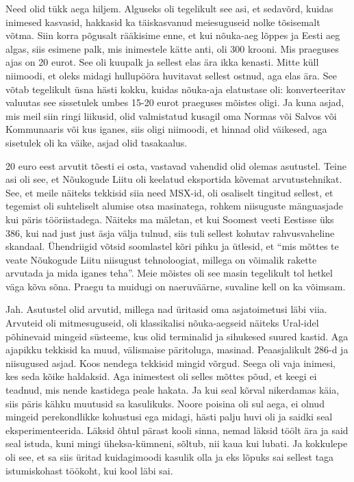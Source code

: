 
Need olid  tükk aega hiljem. Alguseks oli tegelikult see asi, et sedavõrd, 
kuidas inimesed kasvasid, hakkasid ka täiskasvanud  meiesuguseid nolke 
tõsisemalt võtma. Siin korra põgusalt rääkisime enne, et kui nõuka-aeg lõppes 
ja Eesti aeg algas, siis esimene palk, mis inimestele kätte anti, oli 300 
krooni. Mis praeguses ajas on 20 eurot. See oli kuupalk ja sellest elas ära 
ikka kenasti. Mitte küll niimoodi, et oleks midagi hullupööra huvitavat sellest 
ostnud, aga elas ära. See võtab tegelikult üsna hästi kokku, kuidas nõuka-aja 
elatustase oli: konverteeritav valuutas see sissetulek umbes 15-20 eurot 
praeguses mõistes oligi. Ja kuna asjad, mis meil siin ringi liikusid, olid 
valmistatud kusagil oma Normas või Salvos või Kommunaaris või kus iganes,  siis 
 oligi niimoodi,  et hinnad olid väikesed, aga sisetulek oli ka väike, asjad 
olid tasakaalus. 


20 euro eest arvutit tõesti ei osta, vastavad vahendid olid olemas asutustel. 
Teine asi oli see, et Nõukogude Liitu oli keelatud eksportida kõvemat 
arvutustehnikat. See, et meile näiteks tekkisid siia need MSX-id, oli osaliselt 
tingitud sellest, et tegemist oli suhteliselt alumise otsa masinatega,  rohkem 
niisuguste mänguasjade kui  päris tööriistadega. Näiteks ma mäletan, et kui 
Soomest veeti Eestisse üks 386, kui nad just just äsja välja tulnud,  siis tuli 
sellest kohutav rahvusvaheline skandaal. Ühendriigid võtsid soomlastel kõri 
pihku ja ütlesid, et \enquote{mis mõttes te veate Nõukogude Liitu niisugust 
tehnoloogiat, millega on võimalik rakette arvutada ja mida iganes teha}. Meie 
mõistes oli see masin tegelikult tol hetkel väga kõva sõna. Praegu ta muidugi 
on naeruväärne, suvaline kell on ka võimsam.


Jah. Asutustel olid arvutid, millega nad üritasid oma asjatoimetusi läbi viia.
Arvuteid oli mitmesuguseid, oli klassikalisi nõuka-aegseid näiteks Ural-idel 
põhinevaid mingeid süsteeme, kus olid terminalid ja sihukesed suured kastid.
Aga ajapikku tekkisid ka muud, välismaise päritoluga, masinad. Peaasjalikult 
286-d ja niisugused asjad. Koos nendega tekkisid mingid võrgud. Seega oli vaja 
inimesi, kes seda kõike haldaksid. Aga inimestest oli selles mõttes põud, et 
keegi ei teadnud, mis nende kastidega peale hakata. Ja kui seal kõrval 
nikerdamas käia, siis päris kähku muutusid sa kasulikuks. Noore poisina oli sul 
aega, ei olnud mingeid perekondlikke kohustusi ega midagi, hästi palju huvi oli 
ja saidki seal eksperimenteerida. Läksid õhtul pärast kooli sinna, nemad läksid 
töölt ära ja said seal istuda, kuni mingi üheksa-kümneni, sõltub, nii kaua kui 
lubati. Ja kokkulepe oli see, et sa siis üritad kuidagimoodi kasulik olla ja 
eks lõpuks sai sellest taga istumiskohast töökoht, kui kool läbi sai.

